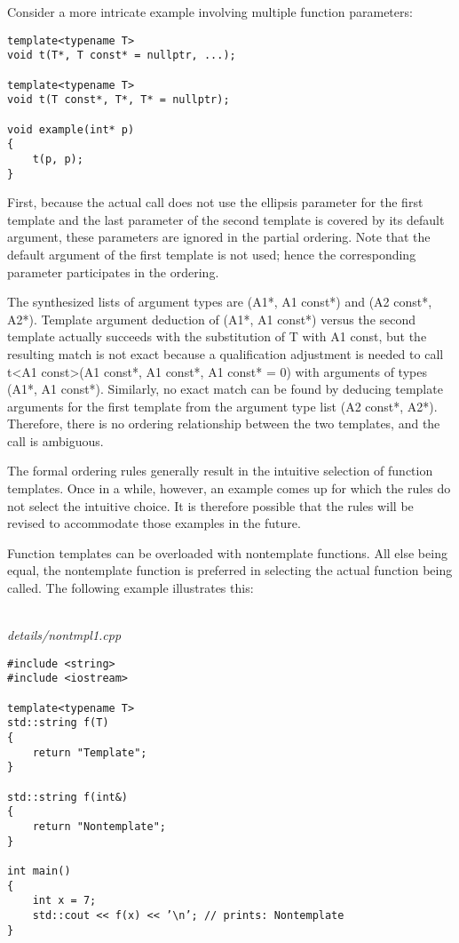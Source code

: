 Consider a more intricate example involving multiple function parameters:

\begin{lstlisting}[style=styleCXX]
template<typename T>
void t(T*, T const* = nullptr, ...);

template<typename T>
void t(T const*, T*, T* = nullptr);

void example(int* p)
{
	t(p, p);
}
\end{lstlisting}

First, because the actual call does not use the ellipsis parameter for the first template and the last parameter of the second template is covered by its default argument, these parameters are ignored in the partial ordering. Note that the default argument of the first template is not used; hence the corresponding parameter participates in the ordering.

The synthesized lists of argument types are (A1*, A1 const*) and (A2 const*, A2*). Template argument deduction of (A1*, A1 const*) versus the second template actually succeeds with the substitution of T with A1 const, but the resulting match is not exact because a qualification adjustment is needed to call t<A1 const>(A1 const*, A1 const*, A1 const* = 0) with arguments of types (A1*, A1 const*). Similarly, no exact match can be found by deducing template arguments for the first template from the argument type list (A2 const*, A2*). Therefore, there is no ordering relationship between the two templates, and the call is ambiguous.

The formal ordering rules generally result in the intuitive selection of function templates. Once in a while, however, an example comes up for which the rules do not select the intuitive choice. It is therefore possible that the rules will be revised to accommodate those examples in the future.


Function templates can be overloaded with nontemplate functions. All else being equal, the nontemplate function is preferred in selecting the actual function being called. The following example illustrates this:

\hspace*{\fill} \\ %
\noindent
\textit{details/nontmpl1.cpp}
\begin{lstlisting}[style=styleCXX]
#include <string>
#include <iostream>

template<typename T>
std::string f(T)
{
	return "Template";
}

std::string f(int&)
{
	return "Nontemplate";
}

int main()
{
	int x = 7;
	std::cout << f(x) << ’\n’; // prints: Nontemplate
}
\end{lstlisting}

